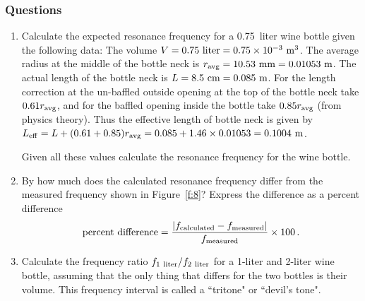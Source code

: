 \documentclass[11pt]{NSF}
\def\be{\begin{equation}}
\def\ee{\end{equation}}
\def\ben{\begin{enumerate}}
\def\een{\end{enumerate}}
\def\i{\item{}}
\begin{document}
\subsubsection*{Questions}
\ben
\i Calculate the expected resonance frequency for a 
0.75~liter wine bottle given the following data:
The volume $V= 0.75~{\rm liter} = 0.75\times10^{-3}~{\rm m}^3$.
The average radius at the middle of the bottle neck 
is $r_{\rm avg} = 10.53~{\rm mm} = 0.01053~{\rm m}$.
The actual length of the bottle neck is
$L = 8.5~{\rm cm} = 0.085~{\rm m}$. 
For the length correction at the un-baffled outside opening 
at the top of the bottle neck take $0.61 r_{\rm avg}$, 
and for the baffled opening inside the bottle take 
$0.85 r_{\rm avg}$ (from physics theory). 
Thus the effective length of bottle neck is given by 
$L_{\rm eff} = L +(0.61 + 0.85) r_{\rm avg} = 
0.085 + 1.46 \times 0.01053 = 0.1004~{\rm m}$. 

Given all these values calculate the resonance frequency
for the wine bottle.

\i By how much does the calculated resonance frequency
differ from the measured frequency shown in Figure~\ref{f:8}?
Express the difference as a percent difference
%
\be
\text{percent difference} = 
\frac{|f_{\rm calculated}-f_{\rm measured}|}{f_{\rm measured}} 
\times 100\,.\ee

\i Calculate the frequency ratio $f_{\rm 1~liter}/f_{\rm 2~liter}$
for a 1-liter and 2-liter wine bottle, assuming that the only thing 
that differs for the two bottles is their volume.
This frequency interval is called a ``tritone" or ``devil's tone".
\een
\end{document}
